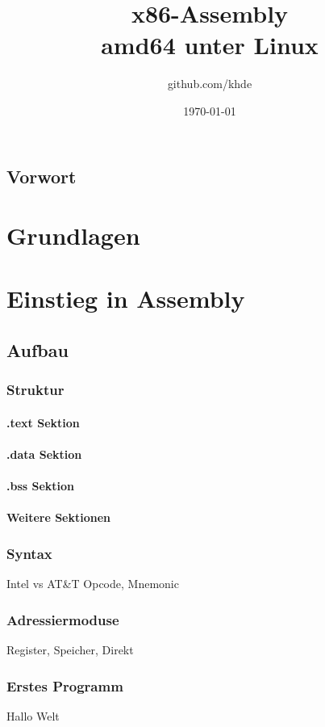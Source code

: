 \documentclass[12pt, a4paper, utf8]{book}
\title{x86-Assembly \\ \small{amd64 unter Linux}}
\author{github.com/khde}
\date{\today}
\begin{document}
\maketitle

\tableofcontents{}

\chapter*{Vorwort}

\part{Grundlagen}


\part{Einstieg in Assembly}
\chapter{Aufbau}
\section{Struktur}
\subsection{.text Sektion}
\subsection{.data Sektion}
\subsection{.bss Sektion}
\subsection{Weitere Sektionen}
\section{Syntax}
    Intel vs AT\&T
    Opcode, Mnemonic
\section{Adressiermoduse}
    Register, Speicher, Direkt
\section{Erstes Programm}
    Hallo Welt
\end{document}
